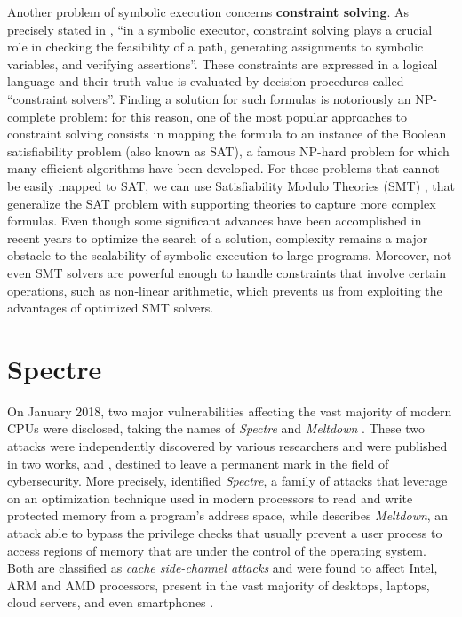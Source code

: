 \documentclass[target=mst,aauheader=aics]{thud}
\theoremstyle{definition}
\begin{document}
	Another problem of symbolic execution concerns \textbf{constraint solving}. As precisely stated in \cite{Baldoni2018}, ``in a symbolic executor, constraint solving plays a crucial role in checking the feasibility of a path, generating assignments to symbolic variables, and verifying assertions''. These constraints are expressed in a logical language and their truth value is evaluated by decision procedures called ``constraint solvers''. 
	Finding a solution for such formulas is notoriously an NP-complete problem: for this reason, one of the most popular approaches to constraint solving consists in mapping the formula to an instance of the Boolean satisfiability problem (also known as SAT), a famous NP-hard problem for which many efficient algorithms have been developed. For those problems that cannot be easily mapped to SAT, we can use Satisfiability Modulo Theories (SMT) \cite{Tinelli2006}, that generalize the SAT problem with supporting theories to capture more complex formulas. Even though some significant advances have been accomplished in recent years to optimize the search of a solution, complexity remains a major obstacle to the scalability of symbolic execution to large programs. Moreover, not even SMT solvers are powerful enough to handle constraints that involve certain operations, such as non-linear arithmetic, which prevents us from exploiting the advantages of optimized SMT solvers.
	
	\chapter{Spectre}\label{chapter:spectre}
	On January 2018, two major vulnerabilities affecting the vast majority of modern CPUs were disclosed, taking the names of \textit{Spectre} \cite{Kocher2019} and \textit{Meltdown} \cite{Lipp2018}. These two attacks were independently discovered by various researchers and were published in 
	two works, \cite{Kocher2019} and \cite{Lipp2018}, destined to leave a permanent mark in the field of cybersecurity. More precisely, \cite{Kocher2019} identified \textit{Spectre}, a family of attacks that leverage on an optimization technique used in modern processors to read and write protected memory from a program's address space, while \cite{Lipp2018} describes \textit{Meltdown}, an attack able to bypass the privilege checks that usually prevent a user process to access regions of memory that are under the control of the operating system. Both are classified as \textit{cache side-channel attacks} and were found to affect Intel, ARM and AMD processors, present in the vast majority of desktops, laptops, cloud servers, and even smartphones \cite{Spectre_official}.
	
\end{document}
